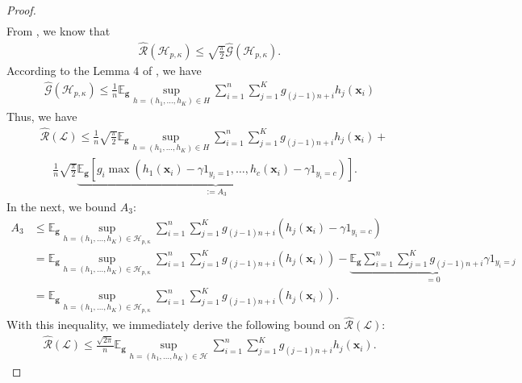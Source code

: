 \documentclass[10pt]{llncs}
\begin{document}
\begin{proof}
\begin{align*}
  \end{align*}
  From \cite{ledoux2013probability}, we know that
  \begin{align*}
    \hat{\mathcal{R}}(\mathcal{H}_{p,\kappa})\leq \sqrt{\frac{\pi}{2}}\hat{\mathcal{G}}(\mathcal{H}_{p,\kappa}).
  \end{align*}
  According to the Lemma 4 of \cite{lei2015multi}, we have
  \begin{align*}
    \hat{\mathcal{G}}(\mathcal{H}_{p,\kappa})
    \leq \frac{1}{n}\mathbb{E}_{\bm g}\sup_{h=(h_1,\ldots,h_K)\in H}\sum_{i=1}^n\sum_{j=1}^Kg_{(j-1)n+i}h_j(\mathbf x_i)
  \end{align*}
  Thus, we have
  \begin{align*}
    &\hat{\mathcal{R}}(\mathcal{L}) \leq \frac{1}{n}\sqrt{\frac{\pi}{2}}\mathbb{E}_{\bm g}\sup_{h=(h_1,\ldots,h_K)\in H}\sum_{i=1}^n\sum_{j=1}^Kg_{(j-1)n+i}h_j(\mathbf x_i)+\\
    &~~~~~\frac{1}{n}\sqrt{\frac{\pi}{2}}\underbrace{\mathbb{E}_{\bm g}\left[g_i\max(h_1(\mathbf x_i)-\gamma 1_{y_i=1},\ldots,h_c(\mathbf x_i)-\gamma 1_{y_i=c})\right]}_{:=A_3}.
  \end{align*}
In the next, we bound $A_3$:
  \begin{align*}
    A_3&\leq\mathbb{E}_{\bm g}\sup_{h=(h_1,\ldots,h_K)\in \mathcal{H}_{p,\kappa}}\sum_{i=1}^n\sum_{j=1}^Kg_{(j-1)n+i}\left(h_j(\mathbf x_i)-\gamma 1_{y_i=c}\right)\\
       &=\mathbb{E}_{\bm g}\sup_{h=(h_1,\ldots,h_K)\in \mathcal{H}_{p,\kappa}}\sum_{i=1}^n\sum_{j=1}^Kg_{(j-1)n+i}\left(h_j(\mathbf x_i)\right)
       -\underbrace{\mathbb{E}_{\bm g}\sum_{i=1}^n\sum_{j=1}^Kg_{(j-1)n+i}\gamma 1_{y_i=j}}_{=0}\\
       &=\mathbb{E}_{\bm g}\sup_{h=(h_1,\ldots,h_K)\in \mathcal{H}_{p,\kappa}}\sum_{i=1}^n\sum_{j=1}^Kg_{(j-1)n+i}\left(h_j(\mathbf x_i)\right).
  \end{align*}
  With this inequality, we immediately derive the following bound on $\hat{\mathcal{R}}(\mathcal{L})$:
  \begin{align*}
    \hat{\mathcal{R}}(\mathcal{L})\leq \frac{\sqrt{2\pi}}{n}\mathbb{E}_{\mathbf g}\sup_{h=(h_1,\ldots,h_K)
  \in\mathcal{H}}\sum_{i=1}^n\sum_{j=1}^Kg_{(j-1)n+i}h_j(\mathbf x_i).
  \end{align*}
  \end{proof}
\end{document}
